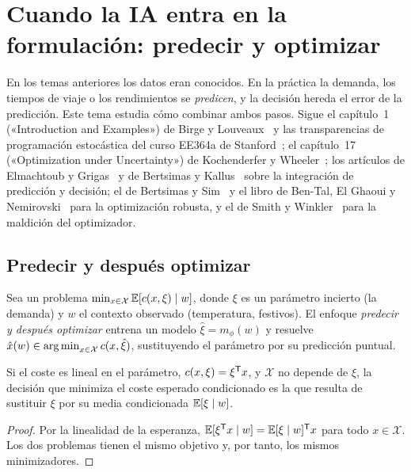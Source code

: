 \chapter{Cuando la IA entra en la formulación: predecir y optimizar}
\label{tema:6}

En los temas anteriores los datos eran conocidos. En la práctica la demanda, los tiempos de viaje o los rendimientos se \emph{predicen}, y la decisión hereda el error de la predicción. Este tema estudia cómo combinar ambos pasos. Sigue el capítulo~1 («Introduction and Examples») de Birge y Louveaux~\cite{bl} y las transparencias de programación estocástica del curso EE364a de Stanford~\cite{ee364stoch}; el capítulo~17 («Optimization under Uncertainty») de Kochenderfer y Wheeler~\cite{kw}; los artículos de Elmachtoub y Grigas~\cite{spo} y de Bertsimas y Kallus~\cite{bk} sobre la integración de predicción y decisión; el de Bertsimas y Sim~\cite{bsim} y el libro de Ben-Tal, El Ghaoui y Nemirovski~\cite{btn} para la optimización robusta, y el de Smith y Winkler~\cite{smith} para la maldición del optimizador.

\section{Predecir y después optimizar}

\begin{definicion}\label{def:pto}
Sea un problema $\min_{x\in\mathcal{X}}\mathbb{E}[c(x,\xi)\mid w]$, donde $\xi$ es un parámetro incierto (la demanda) y $w$ el contexto observado (temperatura, festivos). El enfoque \emph{predecir y después optimizar} entrena un modelo $\hat\xi=m_\phi(w)$ y resuelve $\hat x(w)\in\operatorname*{arg\,min}_{x\in\mathcal{X}}c(x,\hat\xi)$, sustituyendo el parámetro por su predicción puntual.
\end{definicion}

\begin{proposicion}\label{prop:lineal}
Si el coste es lineal en el parámetro, $c(x,\xi)=\xi^{\mathsf{T}} x$, y $\mathcal{X}$ no depende de $\xi$, la decisión que minimiza el coste esperado condicionado es la que resulta de sustituir $\xi$ por su media condicionada $\mathbb{E}[\xi\mid w]$.
\end{proposicion}

\begin{proof}
Por la linealidad de la esperanza, $\mathbb{E}[\xi^{\mathsf{T}} x\mid w]=\mathbb{E}[\xi\mid w]^{\mathsf{T}} x$ para todo $x\in\mathcal{X}$. Los dos problemas tienen el mismo objetivo y, por tanto, los mismos minimizadores.
\end{proof}

